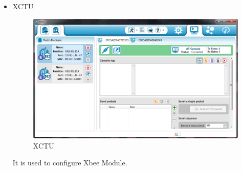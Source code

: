 \documentclass[a4paper,12pt,oneside]{book}
\begin{document}
\begin{itemize}
\begin{itemize}
  \item XCTU
	     \begin{figure}[h]
        \centering
    	\includegraphics[scale=0.5]{xctu.png}
    	\caption{XCTU}
	    \end{figure}
  
  It is used to configure Xbee Module.
  
 \end{itemize} 
\end{itemize}

\newpage
\end{document}
